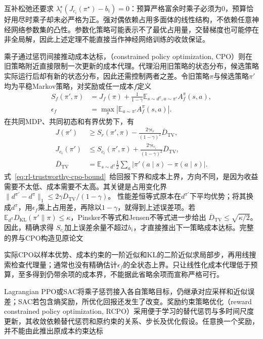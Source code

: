 互补松弛还要求
$\lambda_i^\star(J_{c_i}(\pi^\star)-b_i)=0$：预算严格富余时乘子必须为0，预算恰好用尽时乘子却未必严格为正。强对偶依赖占用多面体的线性结构，不依赖任意神经网络参数集的凸性。参数化策略可能表示不了最优占用量，交替梯度也可能停在非全局解，因此上述定理不能直接当作神经网络训练的收敛保证。

乘子通过惩罚间接推动成本达标，（constrained policy optimization, CPO）则在旧策略附近直接限制一次更新的成本代理。代理沿用旧策略的状态分布，候选策略实际运行后却有新的状态分布，因此还需控制两者之差。令旧策略$\pi$与候选策略$\pi'$均为平稳Markov策略，对奖励或任一成本$f$定义
\[
  \begin{aligned}
    S_f(\pi',\pi)
      &=J_f(\pi)+\frac{1}{1-\gamma}
          \mathbb E_{s\sim d^\pi,a\sim\pi'}A_f^\pi(s,a),\\
    \epsilon_f
      &=\max_s\left|\mathbb E_{a\sim\pi'}A_f^\pi(s,a)\right|.
  \end{aligned}
\]
在共同MDP、共同初态和有界优势下，有
\begin{align}
  J(\pi')&\geq S_r(\pi',\pi)
      -\frac{2\gamma\epsilon_r}{(1-\gamma)^2}\overline D_{\mathrm{TV}},
      \nonumber\\
  J_{c_i}(\pi')&\leq S_{c_i}(\pi',\pi)
      +\frac{2\gamma\epsilon_{c_i}}{(1-\gamma)^2}\overline D_{\mathrm{TV}},
  \label{eq:rl-trustworthy-cpo-bound}\\
  \overline D_{\mathrm{TV}}
    &=\mathbb E_{s\sim d^\pi}
          \frac12\sum_a|\pi'(a\mid s)-\pi(a\mid s)|. \nonumber
\end{align}
式~\eqref{eq:rl-trustworthy-cpo-bound}~给回报下界和成本上界，方向不同，是因为收益需要不太低、成本需要不太高。其关键是占用变化界
$\|d^{\pi'}-d^\pi\|_1\leq
2\gamma\overline D_{\mathrm{TV}}/(1-\gamma)$。
性能差恒等式原本在$d^{\pi'}$下平均优势；将其换成$d^\pi$，用$\epsilon_f$乘上占用差，再除以$1-\gamma$，就得到上述误差项。若
$\mathbb E_{d^\pi}D_{\mathrm{KL}}(\pi'\|\pi)\leq\kappa$，Pinsker不等式和Jensen不等式进一步给出
$\overline D_{\mathrm{TV}}\leq\sqrt{\kappa/2}$。因此，精确求得
$S_{c_i}$加上误差余量不超过$b_i$，才直接推出下一策略成本达标。完整的界与CPO构造见原论文

实际CPO以样本优势、成本约束的一阶近似和KL的二阶近似求局部步，再用线搜索检查代理量；通常也没有精确估计$\epsilon_f$的全状态上界。只让线性化成本代理低于预算，至多得到仍带余项的成本界，不能据此省略余项而宣称严格可行。

Lagrangian PPO或SAC将乘子惩罚接入各自策略目标，仍继承对应采样和近似误差；SAC若包含熵奖励，所优化回报还发生了改变。奖励约束策略优化（reward constrained policy optimization, RCPO）采用便于学习的替代惩罚与多时间尺度更新，其收敛依赖替代惩罚和原约束的关系、步长及优化假设。任意换一个奖励，并不能由此推出原成本约束达标

